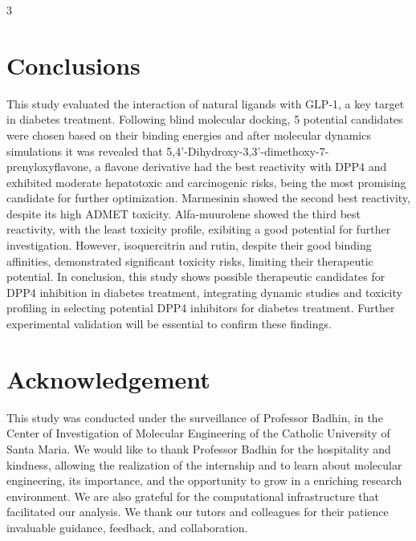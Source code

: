 \documentclass[portrait,final,20pt,ra0]{sciposter}
\begin{document}
\begin{multicols*}{3}
\section*{Conclusions}
This study evaluated the interaction of natural ligands with GLP-1, a key target in diabetes treatment. Following blind molecular docking, 5 potential candidates were chosen based on their binding energies and after molecular dynamics simulations it was revealed that 5,4'-Dihydroxy-3,3'-dimethoxy-7-prenyloxyflavone, a flavone derivative had the best reactivity with DPP4 and exhibited moderate hepatotoxic and carcinogenic risks, being the most promising candidate for further optimization. Marmesinin showed the second best reactivity, despite its high ADMET toxicity. Alfa-muurolene showed the third best reactivity, with the least toxicity profile, exibiting a good potential for further investigation. However, isoquercitrin and rutin, despite their good binding affinities, demonstrated significant toxicity risks, limiting their therapeutic potential. In conclusion, this study shows possible therapeutic candidates for DPP4 inhibition in diabetes treatment, integrating dynamic studies and toxicity profiling in selecting potential DPP4 inhibitors for diabetes treatment. Further experimental validation will be essential to confirm these findings. 


\section*{Acknowledgement}%
This study was conducted under the surveillance of Professor Badhin, in the Center of Investigation of Molecular Engineering of the Catholic University of Santa Maria. We would like to thank Professor Badhin for the hospitality and kindness, allowing the realization of the internship and to learn about molecular engineering, its importance, and the opportunity to grow in a enriching research environment. We are also grateful for the computational infrastructure that facilitated our analysis. We thank our tutors and colleagues for their patience invaluable guidance, feedback, and collaboration.  %
  
  
  


\end{multicols*}
\end{document}
